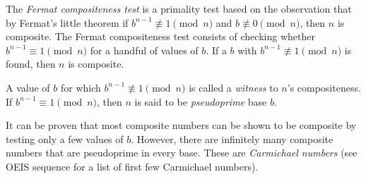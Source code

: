 \documentclass[12pt]{article}
\newcommand{\nequiv}{\not\equiv}
\begin{document}
The \emph{Fermat compositeness test} is a primality test based on the observation that by Fermat's little theorem if $b^{n-1} \nequiv 1\pmod n$ and $b\nequiv 0\pmod n$, then $n$ is composite. The Fermat compositeness test consists of checking whether $b^{n-1} \equiv 1\pmod n$ for a handful of values of $b$. If a $b$ with $b^{n-1} \nequiv 1\pmod n$ is found, then $n$ is composite. 

A value of $b$ for which $b^{n-1} \nequiv 1\pmod n$ is called a \emph{witness} to $n$'s compositeness. If $b^{n-1} \equiv 1\pmod n$, then $n$ is said to be \emph{pseudoprime} base $b$.

It can be proven that most composite numbers can be shown to be composite by testing only a few values of $b$. However, there are infinitely many composite numbers that are pseudoprime in every base. These are \emph{Carmichael numbers} (see OEIS sequence  for a list of first few Carmichael numbers).
\end{document}

